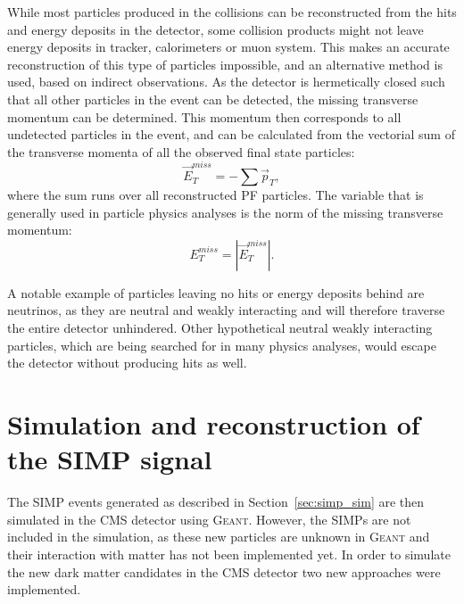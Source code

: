 While most particles produced in the collisions can be reconstructed from the hits and energy deposits in the detector, some collision products might not leave energy deposits in tracker, calorimeters or muon system. This makes an accurate reconstruction of this type of particles impossible, and an alternative method is used, based on indirect observations. As the detector is hermetically closed such that all other particles in the event can be detected, the missing transverse momentum can be determined. This momentum then corresponds to all undetected particles in the event, and can be calculated from the vectorial sum of the transverse momenta of all the observed final state particles:
\begin{equation}
 \vec{E}_T^{miss} = - \sum \vec{p}_T,
\end{equation}
where the sum runs over all reconstructed \ac{PF} particles. The variable that is generally used in particle physics analyses is the norm of the missing transverse momentum:
\begin{equation}
 E_T^{miss} = |\vec{E}_T^{miss}|.
\end{equation}

A notable example of particles leaving no hits or energy deposits behind are neutrinos, as they are neutral and weakly interacting and will therefore traverse the entire detector unhindered. Other hypothetical neutral weakly interacting particles, which are being searched for in many physics analyses, would escape the detector without producing hits as well.

\section{Simulation and reconstruction of the SIMP signal}
\label{sec:SIMPs}



The \ac{SIMP} events generated as described in Section~\ref{sec:simp_sim} are then simulated in the \ac{CMS} detector using \textsc{Geant}. However, the \acp{SIMP} are not included in the simulation, as these new particles are unknown in \textsc{Geant} and their interaction with matter has not been implemented yet. In order to simulate the new dark matter candidates in the \ac{CMS} detector two new approaches were implemented.

